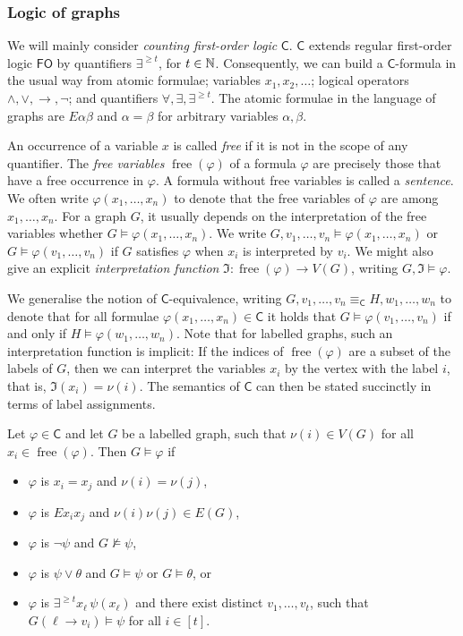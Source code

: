 \documentclass{lmcs}
\theoremstyle{plain}\newtheorem{claim}[thm]{Claim}   %
\newcommand{\NN}{\ensuremath \mathbb{N}}
\newcommand{\fI}{\ensuremath{\mathfrak I}}
\DeclareMathOperator{\free}{free}
\newcommand{\lFO}{\ensuremath{\mathsf{FO}}}
\newcommand{\lC} {\ensuremath{\mathsf C}}
\newcommand{\impl}{\ensuremath{\rightarrow}}
\begin{document}
\subsubsection{Logic of graphs}

We will mainly consider \emph{counting first-order logic} $\lC$. $\lC$ extends regular first-order logic $\lFO$ by quantifiers $\exists^{{\geq} t}$, for $t \in \NN$. Consequently, we can build a $\lC$-formula in the usual way from atomic formulae; variables $x_1, x_2, \dots$; logical operators $\land, \lor, \impl, \neg$; and quantifiers $\forall, \exists, \exists^{{\geq} t}$. The atomic formulae in the language of graphs are $E\alpha\beta$ and $\alpha = \beta$ for arbitrary variables $\alpha, \beta$.

An occurrence of a variable $x$ is called \emph{free} if it is not in the scope of any quantifier. The \emph{free variables} $\free(\varphi)$ of a formula $\varphi$ are precisely those that have a free occurrence in $\varphi$. A formula without free variables is called a \emph{sentence}. We often write $\varphi(x_1, \dots, x_n)$ to denote that the free variables of $\varphi$ are among $x_1, \dots, x_n$. For a graph $G$, it usually depends on the interpretation of the free variables whether $G \models \varphi(x_1, \dots, x_n)$. We write $G, v_1, \dots, v_n \models \varphi(x_1, \dots, x_n)$ or $G \models \varphi(v_1, \dots, v_n)$ if $G$ satisfies $\varphi$ when $x_i$ is interpreted by $v_i$. We might also give an explicit \emph{interpretation function} $\fI \colon \free(\varphi) \to V(G)$, writing $G, \fI \models \varphi$.

We generalise the notion of $\lC$-equivalence, writing $G, v_1, \dots, v_n \equiv_\lC H, w_1, \dots, w_n$ to denote that for all formulae $\varphi(x_1, \dots, x_n) \in \lC$ it holds that $G \models \varphi(v_1, \dots, v_n)$ if and only if $H \models \varphi(w_1, \dots, w_n)$. Note that for labelled graphs, such an interpretation function is implicit: If the indices of $\free(\varphi)$ are a subset of the labels of $G$, then we can interpret the variables $x_i$ by the vertex with the label $i$, that is, $\fI(x_i) = \nu(i)$. The semantics of $\lC$ can then be stated succinctly in terms of label assignments.

\begin{defi}[$\lC$ semantics of labelled graphs]
	Let $\varphi \in \lC$ and let $G$ be a labelled graph, such that $\nu(i) \in V(G)$ for all $x_i \in \free(\varphi)$. Then $G \models \varphi$ if
	\begin{itemize}
		\item $\varphi$ is $x_i = x_j$ and $\nu(i) = \nu(j)$,
		\item $\varphi$ is $Ex_ix_j$ and $\nu(i)\nu(j) \in E(G)$,
		\item $\varphi$ is $\neg \psi$ and $G \not\models \psi$,
		\item $\varphi$ is $\psi \lor \theta$ and $G \models \psi$ or $G \models \theta$, or
		\item $\varphi$ is $\exists^{{\geq} t} x_\ell\, \psi(x_\ell)$ and there exist distinct $v_1, \dots, v_t$, such that $G(\ell \to v_i) \models \psi$ for all $i \in [t]$.
	\end{itemize}
\end{defi}
\end{document}
